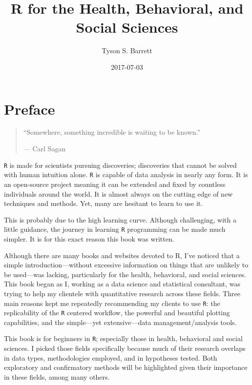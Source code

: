 \documentclass[]{tufte-book}
\title{R for the Health, Behavioral, and Social Sciences}
\author{Tyson S. Barrett}
\date{2017-07-03}
\theoremstyle{definition}
\theoremstyle{definition}
\theoremstyle{remark}
\begin{document}
\maketitle



{
\setcounter{tocdepth}{1}
\tableofcontents
}

\chapter*{Preface}\label{preface}

\begin{quote}
``Somewhere, something incredible is waiting to be known.''

--- Carl Sagan
\end{quote}

\texttt{R} is made for scientists pursuing discoveries; discoveries that
cannot be solved with human intuition alone. \texttt{R} is capable of
data analysis in nearly any form. It is an open-source project meaning
it can be extended and fixed by countless individuals around the world.
It is almost always on the cutting edge of new techniques and methods.
Yet, many are hesitant to learn to use it.

This is probably due to the high learning curve. Although challenging,
with a little guidance, the journey in learning \texttt{R} programming
can be made much simpler. It is for this exact reason this book was
written.

Although there are many books and websites devoted to R, I've noticed
that a simple introduction---without excessive information on things
that are unlikely to be used---was lacking, particularly for the health,
behavioral, and social sciences. This book began as I, working as a data
science and statistical consultant, was trying to help my clientele with
quantitative research across these fields. Three main reasons kept me
repeatedly recommending my clients to use \texttt{R}: the replicability
of the \texttt{R} centered workflow, the powerful and beautiful plotting
capabilities, and the simple---yet extensive---data management/analysis
tools.

This book is for beginners in \texttt{R}; especially those in health,
behavioral and social sciences. I picked those fields specifically
because much of their research overlaps in data types, methodologies
employed, and in hypotheses tested. Both exploratory and confirmatory
methods will be highlighted given their importance in these fields,
among many others.
\end{document}
